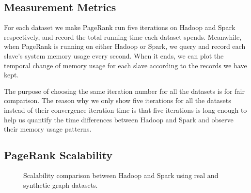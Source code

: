 \documentclass[12pt,conference,letterpaper]{IEEEtran}
\begin{document}
\subsection{Measurement Metrics}
For each dataset we make PageRank run five iterations on Hadoop and Spark respectively, and record the total running time each dataset spends. Meanwhile, when PageRank is running on either Hadoop or Spark, we query and record each slave's system memory usage every second. When it ends, we can plot the temporal change of memory usage for each slave according to the records we have kept.

The purpose of choosing the same iteration number for all the datasets is for fair comparison. The reason why we only show five iterations for all the datasets instead of their convergence iteration time is that five iterations is long enough to help us quantify the time differences between Hadoop and Spark and observe their memory usage patterns.



\subsection{PageRank Scalability}

\begin{figure}[!t]
    \centering
    \caption{Scalability comparison between Hadoop and Spark using real and synthetic graph datasets.}
    \label{fig:time_vs_size}
\end{figure}
\end{document}
